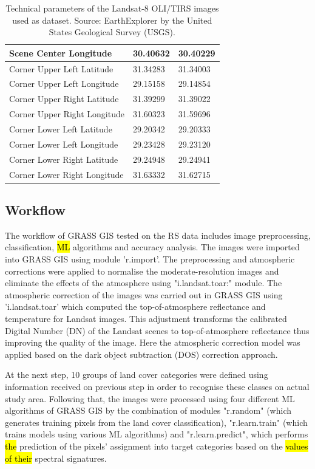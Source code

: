 \documentclass[final,5p,times,twocolumn]{elsarticle}
\numberwithin{table}{section}
\begin{document}
\begin{table}[t]
{\begin{tabular}{|l|l|l|}
        Scene Center Longitude & 30.40632 & 30.40229 \\ \hline
        Corner Upper Left Latitude & 31.34283 & 31.34003 \\ \hline
        Corner Upper Left Longitude & 29.15158 & 29.14854 \\ \hline
        Corner Upper Right Latitude & 31.39299 & 31.39022 \\ \hline
        Corner Upper Right Longitude & 31.60323 & 31.59696 \\ \hline
        Corner Lower Left Latitude & 29.20342 & 29.20333 \\ \hline
        Corner Lower Left Longitude & 29.23428 & 29.23120 \\ \hline
        Corner Lower Right Latitude & 29.24948 & 29.24941 \\ \hline
        Corner Lower Right Longitude & 31.63332 & 31.62715 \\ \hline
    \end{tabular}
    \caption{Technical parameters of the Landsat-8 OLI/TIRS images used as dataset. Source: EarthExplorer by the United States Geological Survey (USGS).}\label{tab01}
    }
\end{table}

\subsection{Workflow}

The workflow of GRASS GIS tested on the RS data includes image preprocessing, classification, \hl{ML} algorithms and accuracy analysis. The images were imported into GRASS GIS using module 'r.import'. The preprocessing and atmospheric corrections were applied to normalise the moderate-resolution images and eliminate the effects of the atmosphere using "i.landsat.toar:" module. The atmospheric correction of the images was carried out in GRASS GIS using 'i.landsat.toar' which computed the top-of-atmosphere reflectance and temperature for Landsat images. This adjustment transforms the calibrated Digital Number (DN) of the Landsat scenes to top-of-atmosphere reflectance thus improving the quality of the image. Here the atmospheric correction model was applied based on the dark object subtraction (DOS) correction approach.

At the next step, 10 groups of land cover categories were defined using information received on previous step in order to recognise these classes on actual study area. Following that, the images were processed using four different ML algorithms of GRASS GIS by the combination of modules "r.random" (which generates training pixels from the land cover classification), "r.learn.train" (which trains models using various ML algorithms) and "r.learn.predict", which performs \hl{the} prediction of the pixels' assignment into target categories based on the \hl{values of their} spectral signatures. 
\end{document}
